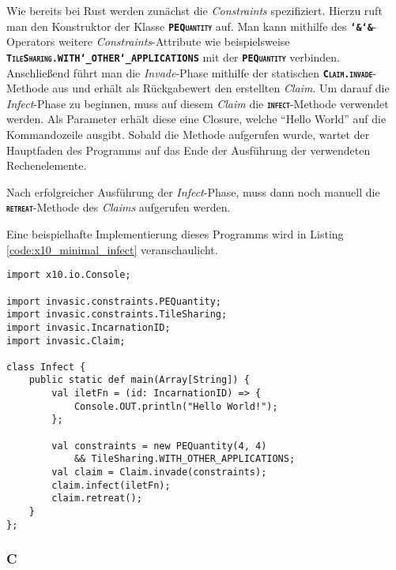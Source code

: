 Wie bereits bei Rust werden zunächst die \textit{Constraints} spezifiziert. Hierzu
ruft man den Konstruktor der Klasse \texttt{\textsc{\textbf{PEQuantity}}} auf. Man kann mithilfe
des \texttt{\textsc{\textbf{\char`&\char`&}}}-Operators weitere \textit{Constraints}-Attribute wie beispielsweise \\
\texttt{\textsc{\textbf{TileSharing.WITH\char`_OTHER\char`_APPLICATIONS}}} mit der
\texttt{\textsc{\textbf{PEQuantity}}} verbinden.
Anschließend führt man die \textit{Invade}-Phase mithilfe der statischen
\texttt{\textsc{\textbf{Claim.invade}}}-Methode aus und erhält als Rückgabewert den erstellten \textit{Claim}.
Um darauf die \textit{Infect}-Phase zu beginnen, muss auf diesem \textit{Claim} die
\texttt{\textsc{\textbf{infect}}}-Methode verwendet werden.
Als Parameter erhält diese eine Closure, welche "`Hello World"' auf die Kommandozeile ausgibt.
Sobald die Methode aufgerufen wurde, wartet der Hauptfaden des Programms auf das Ende der Ausführung der
verwendeten Rechenelemente.

Nach erfolgreicher Ausführung der \textit{Infect}-Phase, muss dann noch manuell die 
\texttt{\textsc{\textbf{retreat}}}-Methode des \textit{Claims} aufgerufen werden.

Eine beispielhafte Implementierung dieses Programms wird in Listing \ref{code:x10_minimal_infect} veranschaulicht.

\lstset{basicstyle=\small}
\begin{lstlisting}[float,caption={Minimales Invade, Infect, Retreat in X10},label=code:x10_minimal_infect]
import x10.io.Console;

import invasic.constraints.PEQuantity;
import invasic.constraints.TileSharing;
import invasic.IncarnationID;
import invasic.Claim;

class Infect {
    public static def main(Array[String]) {
        val iletFn = (id: IncarnationID) => {
            Console.OUT.println("Hello World!");
        };

        val constraints = new PEQuantity(4, 4)
            && TileSharing.WITH_OTHER_APPLICATIONS;
        val claim = Claim.invade(constraints);
        claim.infect(iletFn);
        claim.retreat();
    }
};
\end{lstlisting}
\lstset{basicstyle=\normalsize}

\subsubsection{C}

